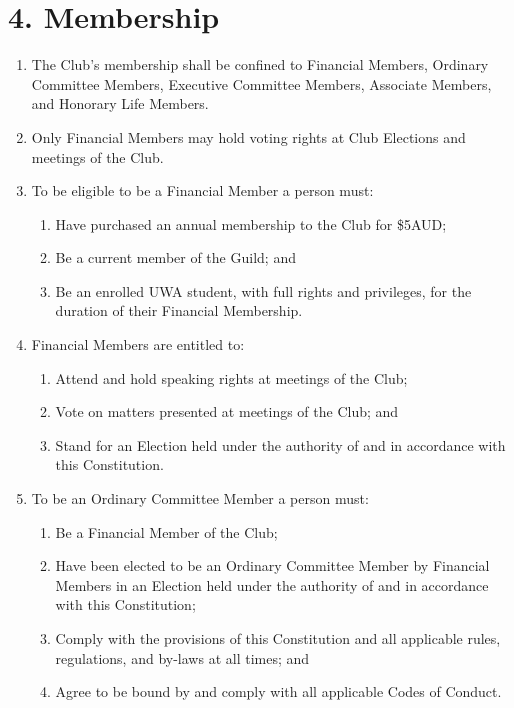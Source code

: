 \documentclass[12pt]{article}
\begin{document}
\section{4. Membership}
\begin{enumerate}[label=4.\arabic*]
    \item The Club’s membership shall be confined to Financial Members, Ordinary Committee Members, Executive Committee Members, Associate Members, and Honorary Life Members.
    \item Only Financial Members may hold voting rights at Club Elections and meetings of the Club.
    \item To be eligible to be a Financial Member a person must:
    \begin{enumerate}[label=\alph*.]
        \item Have purchased an annual membership to the Club for \$5AUD;
        \item Be a current member of the Guild; and
        \item Be an enrolled UWA student, with full rights and privileges, for the duration of their Financial Membership.
    \end{enumerate}
    \item Financial Members are entitled to:
    \begin{enumerate}[label=\alph*.]
        \item Attend and hold speaking rights at meetings of the Club;
        \item Vote on matters presented at meetings of the Club; and
        \item Stand for an Election held under the authority of and in accordance with this Constitution.
    \end{enumerate}
    \item To be an Ordinary Committee Member a person must:
    \begin{enumerate}[label=\alph*.]
        \item Be a Financial Member of the Club;
        \item Have been elected to be an Ordinary Committee Member by Financial Members in an Election held under the authority of and in accordance with this Constitution;
        \item Comply with the provisions of this Constitution and all applicable rules, regulations, and by-laws at all times; and
        \item Agree to be bound by and comply with all applicable Codes of Conduct.
    \end{enumerate}

\end{enumerate}
\end{document}

